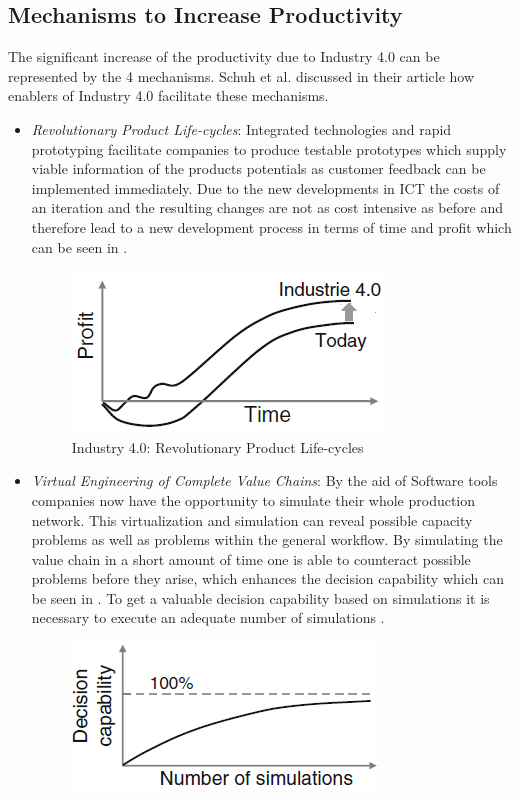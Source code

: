 \subsection{Mechanisms to Increase Productivity}
The significant increase of the productivity due to Industry 4.0 can be represented by the 4 mechanisms. Schuh et al. \cite{IN4HYPO} discussed in their article how enablers of Industry 4.0 facilitate these mechanisms.
\begin{itemize}
\item \textit{Revolutionary Product Life-cycles}: Integrated technologies
and rapid prototyping facilitate companies to produce testable prototypes which supply viable information of the products potentials as customer feedback can be implemented immediately. Due to the new developments in \acs{ICT} the costs of an iteration and the resulting changes are not as cost intensive as before and therefore lead to a new development process in terms of time and profit which can be seen in  \cite{IN4HYPO}.
\begin{figure}[h!]
\includegraphics[scale=0.5]{./gfx/revlifecycle}
\centering
\caption{Industry 4.0: Revolutionary Product Life-cycles \cite{IN4HYPO}}
\label{fig:2.2}
\end{figure}
\item \textit{Virtual Engineering of Complete Value Chains}: By the aid of Software tools companies now have the opportunity to simulate their whole production network. This virtualization and simulation can reveal possible capacity problems as well as problems within the general workflow. By simulating the value chain in a short amount of time one is able to counteract possible problems before they arise, which enhances the decision capability which can be seen in . To get a valuable decision capability based on simulations	it is necessary to execute an adequate number of simulations \cite{IN4HYPO}.
\begin{figure}[h!]
\includegraphics[scale=0.5]{./gfx/revsimul}

\end{figure}
\end{itemize}
